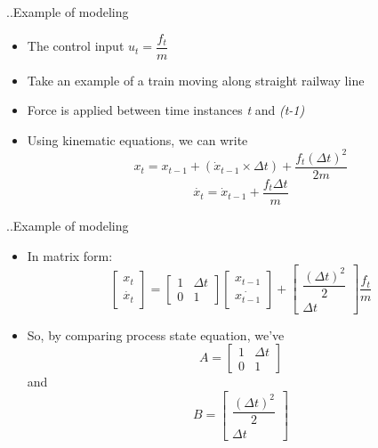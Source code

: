 \documentclass{beamer}
\begin{document}
\begin{frame}{..Example of modeling}
\begin{itemize}
  \item The control input \( u_t = \dfrac{f_t}{m} \)
  \item Take an example of a train moving along straight railway line
  \item Force is applied between time instances \textit{t} and \textit{(t-1)}
  \item Using kinematic equations, we can write
  \[ x_t = x_{t-1} + ( \dot{x}_{t-1} \times \Delta t ) +  \dfrac{f_t(\Delta t)^2}{2m}  \]
  \[ \dot{x_t} = \dot{x}_{t-1} + \dfrac{f_t \Delta t}{m} \]

\end{itemize}
\vskip 1cm
\end{frame}
\begin{frame}{..Example of modeling}
\begin{itemize}
  \item In matrix form:
  \[
    \begin{bmatrix} x_t \\ \dot{x_t} \end{bmatrix} =
    \begin{bmatrix} 1 & \Delta t \\ 0 & 1 \end{bmatrix}
    \begin{bmatrix} x_{t-1} \\ \dot{x_{t-1}} \end{bmatrix} +
    \begin{bmatrix} \dfrac{(\Delta t)^2}{2} \\ \Delta t \end{bmatrix}
    \dfrac{f_t}{m}
  \]
  \item So, by comparing process state equation, we've
  \[ A = \begin{bmatrix} 1 & \Delta t \\ 0 & 1 \end{bmatrix} \]
  and
  \[ B =  \begin{bmatrix} \dfrac{(\Delta t)^2}{2} \\ \Delta t \end{bmatrix} \]
\end{itemize}
\vskip 1cm
\end{frame}
\end{document}
